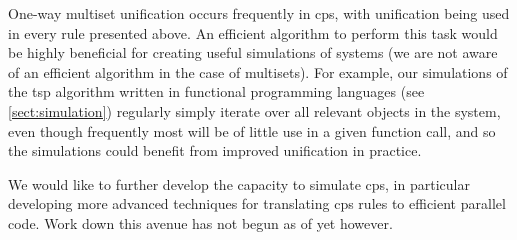 One-way multiset unification occurs frequently in \gls{cps}, with unification being used in every rule presented above.  An efficient algorithm to perform this task would be highly beneficial for creating useful simulations of systems (we are not aware of an efficient algorithm in the case of multisets).  For example, our simulations of the \gls{tsp} algorithm written in functional programming languages (see \autoref{sect:simulation}) regularly simply iterate over all relevant objects in the system, even though frequently most will be of little use in a given function call, and so the simulations could benefit from improved unification in practice.

We would like to further develop the capacity to simulate \gls{cps}, in particular developing more advanced techniques for translating \gls{cps} rules to efficient parallel code.  Work down this avenue has not begun as of yet however.